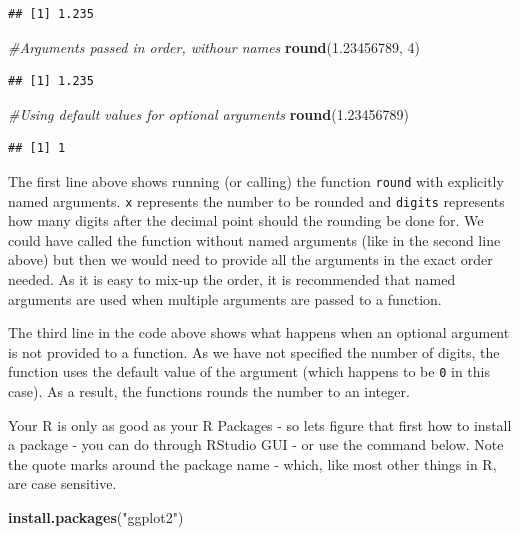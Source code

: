 \documentclass[]{krantz}
\makeatletter
\newenvironment{Shaded}{\begin{snugshade}}{\end{snugshade}}
\newcommand{\KeywordTok}[1]{\textcolor[rgb]{0.27,0.27,0.27}{\textbf{#1}}}
\newcommand{\DecValTok}[1]{\textcolor[rgb]{0.06,0.06,0.06}{#1}}
\newcommand{\FloatTok}[1]{\textcolor[rgb]{0.06,0.06,0.06}{#1}}
\newcommand{\StringTok}[1]{\textcolor[rgb]{0.5,0.5,0.5}{#1}}
\newcommand{\CommentTok}[1]{\textcolor[rgb]{0.37,0.37,0.37}{\textit{#1}}}
\newcommand{\NormalTok}[1]{#1}
\newenvironment{kframe}{%
\medskip{}
\setlength{\fboxsep}{.8em}
 \def\at@end@of@kframe{}%
 \ifinner\ifhmode%
  \def\at@end@of@kframe{\end{minipage}}%
  \begin{minipage}{\columnwidth}%
 \fi\fi%
 \def\FrameCommand##1{\hskip\@totalleftmargin \hskip-\fboxsep
 \colorbox{shadecolor}{##1}\hskip-\fboxsep
     \hskip-\linewidth \hskip-\@totalleftmargin \hskip\columnwidth}%
 \MakeFramed {\advance\hsize-\width
   \@totalleftmargin\z@ \linewidth\hsize
   \@setminipage}}%
 {\par\unskip\endMakeFramed%
 \at@end@of@kframe}
\renewenvironment{Shaded}{\begin{kframe}}{\end{kframe}}
\makeatother
\begin{document}
\begin{verbatim}
## [1] 1.235
\end{verbatim}

\begin{Shaded}
\begin{Highlighting}[]
\CommentTok{#Arguments passed in order, withour names}
\KeywordTok{round}\NormalTok{(}\FloatTok{1.23456789}\NormalTok{, }\DecValTok{4}\NormalTok{)}
\end{Highlighting}
\end{Shaded}

\begin{verbatim}
## [1] 1.235
\end{verbatim}

\begin{Shaded}
\begin{Highlighting}[]
\CommentTok{#Using default values for optional arguments}
\KeywordTok{round}\NormalTok{(}\FloatTok{1.23456789}\NormalTok{) }
\end{Highlighting}
\end{Shaded}

\begin{verbatim}
## [1] 1
\end{verbatim}

The first line above shows running (or calling) the function
\texttt{round} with explicitly named arguments. \texttt{x} represents
the number to be rounded and \texttt{digits} represents how many digits
after the decimal point should the rounding be done for. We could have
called the function without named arguments (like in the second line
above) but then we would need to provide all the arguments in the exact
order needed. As it is easy to mix-up the order, it is recommended that
named arguments are used when multiple arguments are passed to a
function.

The third line in the code above shows what happens when an optional
argument is not provided to a function. As we have not specified the
number of digits, the function uses the default value of the argument
(which happens to be \texttt{0} in this case). As a result, the
functions rounds the number to an integer.

Your R is only as good as your R Packages - so lets figure that first
how to install a package - you can do through RStudio GUI - or use the
command below. Note the quote marks around the package name - which,
like most other things in R, are case sensitive.

\begin{Shaded}
\begin{Highlighting}[]
\KeywordTok{install.packages}\NormalTok{(}\StringTok{"ggplot2"}\NormalTok{)}
\end{Highlighting}
\end{Shaded}
\end{document}
